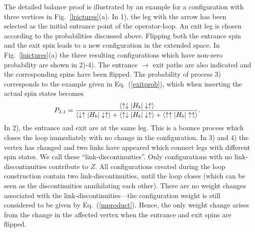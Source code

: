 \documentclass[10pt,pre,aps,twocolumn,showpacs,superscriptaddress,
floatfix]{revtex4}
\begin{document}
The detailed balance proof is 
illustrated by an example for a configuration with three vertices in 
Fig.~\ref{lpictures}(a). In 1), the leg with the arrow has been selected as 
the initial entrance point of the operator-loop. An exit leg is chosen 
according to the probabilities discussed above. 
Flipping both the entrance spin and the exit spin leads to a new configuration
in the extended space. In Fig.~\ref{lpictures}(a) the three resulting 
configurations which have non-zero probability are shown in 2)-4). The 
entrance $\rightarrow$ exit paths are also indicated and the corresponding 
spins have been flipped. The probability of process 3) corresponds to the 
example given in Eq.~(\ref{exitprob}), which when inserting the actual spin 
states becomes
\begin{equation}
P_{2,1} = {\langle \uparrow\downarrow|H_b|\downarrow\uparrow\rangle
\over \langle \downarrow\uparrow|H_b|\downarrow\uparrow\rangle +
\langle \uparrow\downarrow|H_b|\downarrow\uparrow\rangle +
\langle \uparrow\uparrow|H_b|\uparrow\uparrow\rangle }.
\end{equation}
In 2), the entrance and exit are at the same leg. This is a bounce process 
which closes the loop immediately with no change in the configuration. 
In 3) and 4) the vertex has changed and two links have 
appeared which connect legs with different spin states. We call these 
``link-discontinuities''. Only configurations with no link-discontinuities 
contribute to $Z$. All configurations created during the loop construction 
contain two link-discontinuities, until the loop closes (which can be seen as 
the discontinuities annihilating each other). There are no weight changes 
associated with the link-discontinuities---the configuration weight is still 
considered to be given by Eq.~(\ref{mproduct}). Hence, the only weight change 
arises from the change in the affected vertex when the entrance and exit 
spins are flipped. 
\end{document}
